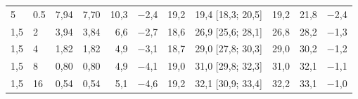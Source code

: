 \begin{table}[htbp]
\begin{tabular}{llrrrrrrrrr}
\addlinespace
1{,}5 & 0.5 & 7{,}94 & 7{,}70 & 10{,}3 & \ensuremath{-}2{,}4 & 19{,}2 & 19{,}4 [18{,}3; 20{,}5] & 19{,}2 & 21{,}8 & \ensuremath{-}2{,}4 \\
1{,}5 & 2 & 3{,}94 & 3{,}84 & 6{,}6 & \ensuremath{-}2{,}7 & 18{,}6 & 26{,}9 [25{,}6; 28{,}1] & 26{,}8 & 28{,}2 & \ensuremath{-}1{,}3 \\
1{,}5 & 4 & 1{,}82 & 1{,}82 & 4{,}9 & \ensuremath{-}3{,}1 & 18{,}7 & 29{,}0 [27{,}8; 30{,}3] & 29{,}0 & 30{,}2 & \ensuremath{-}1{,}2 \\
1{,}5 & 8 & 0{,}80 & 0{,}80 & 4{,}9 & \ensuremath{-}4{,}1 & 19{,}0 & 31{,}0 [29{,}8; 32{,}3] & 31{,}0 & 32{,}1 & \ensuremath{-}1{,}1 \\
1{,}5 & 16 & 0{,}54 & 0{,}54 & 5{,}1 & \ensuremath{-}4{,}6 & 19{,}2 & 32{,}1 [30{,}9; 33{,}4] & 32{,}2 & 33{,}1 & \ensuremath{-}1{,}0 \\
\bottomrule\end{tabular}\end{table}
